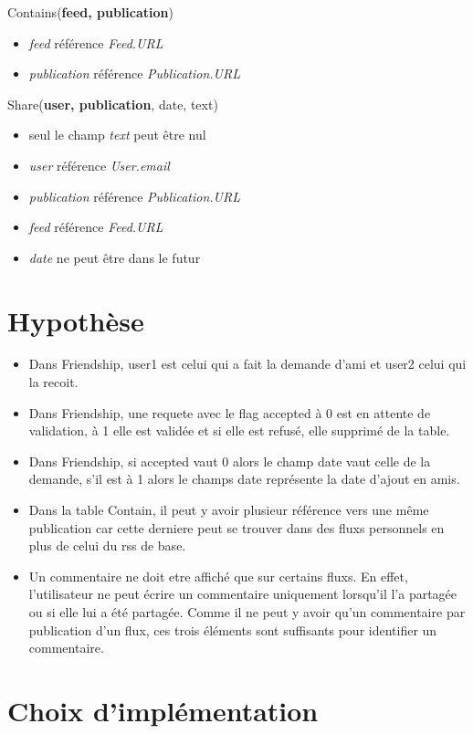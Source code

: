\documentclass[a4paper,10pt]{article}
\begin{document}
        Contains(\textbf{feed, publication})
        \begin{itemize}            
            \item \textit{feed} référence \textit{Feed.URL}
            \item \textit{publication} référence \textit{Publication.URL}
        \end{itemize}
            
        Share(\textbf{user, publication}, date, text)
        \begin{itemize}
			\item seul le champ \textit{text} peut être nul
            \item \textit{user} référence \textit{User.email}
            \item \textit{publication} référence \textit{Publication.URL}
            \item \textit{feed} référence \textit{Feed.URL}
            \item \textit{date} ne peut être dans le futur
        \end{itemize}
		
\section{Hypothèse}
\begin{itemize}
\item Dans Friendship, user1 est celui qui a fait la demande d'ami et user2 celui qui la recoit.
\item Dans Friendship, une requete avec le flag accepted à 0 est en attente de validation, à 1 elle est validée et si elle est refusé, elle supprimé de la table.
\item Dans Friendship, si accepted vaut 0 alors le champ date vaut celle de la demande, s'il est à 1 alors le champs date représente la date d'ajout en amis.
\item Dans la table Contain, il peut y avoir plusieur référence vers une même publication car cette derniere peut se trouver dans des fluxs personnels en plus de celui du rss de base.
\item Un commentaire ne doit etre affiché que sur certains fluxs. En effet, l'utilisateur ne peut écrire un commentaire uniquement lorsqu'il l'a partagée ou si elle lui a été partagée. Comme il ne peut y avoir qu'un commentaire par publication d'un flux, ces trois éléments sont suffisants pour identifier un commentaire.
\end{itemize}
\section{Choix d'implémentation}
\end{document}
